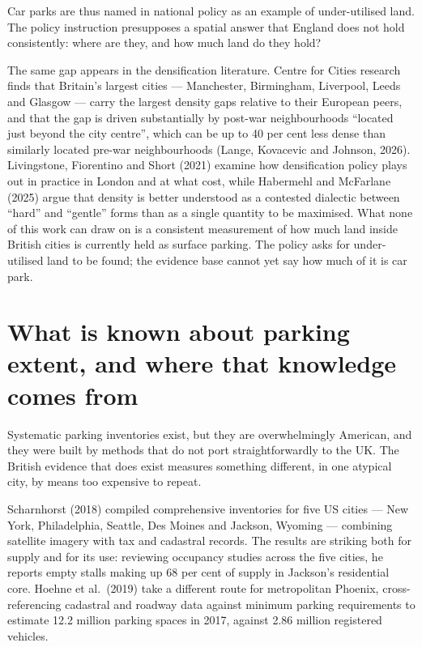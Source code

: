 Car parks are thus named in national policy as an example of under-utilised land. The policy instruction presupposes a spatial answer that England does not hold consistently: where are they, and how much land do they hold?

The same gap appears in the densification literature. Centre for Cities research finds that Britain's largest cities --- Manchester, Birmingham, Liverpool, Leeds and Glasgow --- carry the largest density gaps relative to their European peers, and that the gap is driven substantially by post-war neighbourhoods ``located just beyond the city centre'', which can be up to 40 per cent less dense than similarly located pre-war neighbourhoods (Lange, Kovacevic and Johnson, 2026). Livingstone, Fiorentino and Short (2021) examine how densification policy plays out in practice in London and at what cost, while Habermehl and McFarlane (2025) argue that density is better understood as a contested dialectic between ``hard'' and ``gentle'' forms than as a single quantity to be maximised. What none of this work can draw on is a consistent measurement of how much land inside British cities is currently held as surface parking. The policy asks for under-utilised land to be found; the evidence base
cannot yet say how much of it is car park.

\hypertarget{what-is-known-about-parking-extent-and-where-that-knowledge-comes-from}{%
\section{What is known about parking extent, and where that knowledge comes from}\label{what-is-known-about-parking-extent-and-where-that-knowledge-comes-from}}

Systematic parking inventories exist, but they are overwhelmingly American, and they were built by methods that do not port straightforwardly to the UK. The British evidence that does exist measures something different, in one atypical city, by means too expensive to repeat.

Scharnhorst (2018) compiled comprehensive inventories for five US cities --- New York, Philadelphia, Seattle, Des Moines and Jackson, Wyoming --- combining satellite imagery with tax and cadastral records. The results are striking both for supply and for its use: reviewing occupancy studies across the five cities, he reports empty stalls making up 68 per cent of supply in Jackson's residential core. Hoehne et al.~(2019) take a different route for metropolitan Phoenix, cross-referencing cadastral and roadway data against minimum parking requirements to estimate 12.2 million parking spaces in 2017, against 2.86 million registered vehicles.

